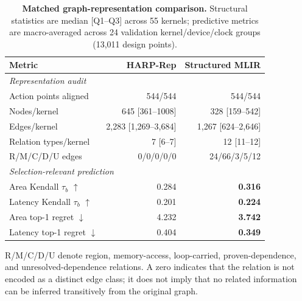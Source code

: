 \begin{table}[t]
  \centering
  \caption{\textbf{Matched graph-representation comparison.}
  Structural statistics are median [Q1--Q3] across 55 kernels;
  predictive metrics are macro-averaged across 24 validation
  kernel/device/clock groups (13,011 design points).}
  \label{tab:representation-predictive}

  \scriptsize
  \setlength{\tabcolsep}{3.0pt}
  \renewcommand{\arraystretch}{1.05}

  \begin{tabular}{lrr}
    \toprule
    \textbf{Metric} &
    \textbf{HARP-Rep} &
    \textbf{Structured MLIR} \\
    \midrule

    \multicolumn{3}{l}{\emph{Representation audit}} \\
    Action points aligned
        & 544/544 & 544/544 \\
    Nodes/kernel
        & 645 [361--1008] & 328 [159--542] \\
    Edges/kernel
        & 2,283 [1,269--3,684] & 1,267 [624--2,646] \\
    Relation types/kernel
        & 7 [6--7] & 12 [11--12] \\
    R/M/C/D/U edges
        & 0/0/0/0/0 & 24/66/3/5/12 \\

    \midrule
    \multicolumn{3}{l}{\emph{Selection-relevant prediction}} \\
    Area Kendall $\tau_b$ $\uparrow$
        & 0.284 & \textbf{0.316} \\
    Latency Kendall $\tau_b$ $\uparrow$
        & 0.201 & \textbf{0.224} \\
    Area top-1 regret $\downarrow$
        & 4.232 & \textbf{3.742} \\
    Latency top-1 regret $\downarrow$
        & 0.404 & \textbf{0.349} \\

    \bottomrule
  \end{tabular}

  \vspace{1pt}
  \parbox{0.98\columnwidth}{\scriptsize
  R/M/C/D/U denote region, memory-access, loop-carried,
  proven-dependence, and unresolved-dependence relations.
  A zero indicates that the relation is not encoded as a distinct
  edge class; it does not imply that no related information can be
  inferred transitively from the original graph.}
\end{table}






